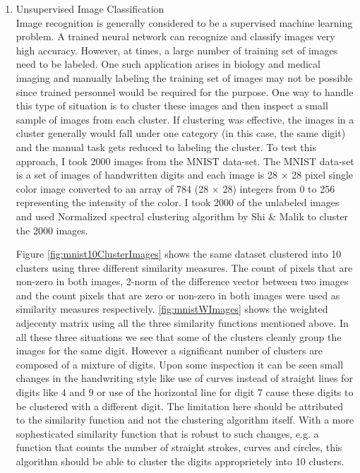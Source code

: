 \documentclass[10pt,a4paper, nocenter]{report}
\begin{document}
\begin{enumerate}
        \item{Unsupervised Image Classification}\\
        Image recognition is generally considered to be a supervised machine learning problem. A trained neural network can recognize and classify images very high accuracy. However, at times, a large number of training set of images need to be labeled. One such application arises in biology and medical imaging and manually labeling the training set of images may not be possible since trained personnel would be required for the purpose. One way to handle this type of situation is to cluster these images and then inspect a small sample of images from each cluster. If clustering was effective, the images in a cluster generally would fall under one category (in this case, the same digit) and the manual task gets reduced to labeling the cluster. To test this approach, I took 2000 images from the MNIST data-set. The MNIST data-set is a set of images of handwritten digits and each image is 28 $\times$ 28 pixel single color image converted to an array of 784 (28 $\times$ 28) integers from 0 to 256 representing the intensity of the color. I took 2000 of the unlabeled images and used Normalized spectral clustering algorithm by Shi \& Malik \cite{Shi-Malik-maxcut-00} to cluster the 2000 images.
        
        Figure \ref{fig:mnist10ClusterImages} shows the same dataset clustered into 10 clusters using three different similarity measures. The count of pixels that are non-zero in both images, 2-norm of the difference vector between two images and the count pixels that are zero or non-zero in both images were used as similarity measures respectively. \ref{fig:mnistWImages} shows the weighted adjecenty matrix using all the three similarity functions mentioned above. In all these three situations we see that some of the clusters cleanly group the images for the same digit. However a significant number of clusters are composed of a mixture of digits. Upon some inspection it can be seen small changes in the handwriting style like use of curves instead of straight lines for digits like 4 and 9 or use of the horizontal line for digit 7 cause these digits to be clustered with a different digit. The limitation here should be attributed to the similarity function and not the clustering algorithm itself. With a more sophesticated similarity function that is robust to such changes, e.g. a function that counts the number of straight strokes, curves and circles, this algorithm should be able to cluster the digits approprietely into 10 clusters.


\end{enumerate}
\end{document}
